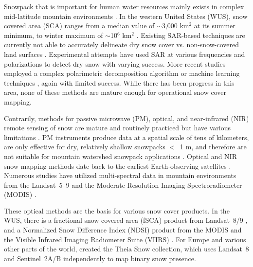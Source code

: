 Snowpack that is important for human water resources mainly exists in complex mid-latitude mountain environments \citep{barnettPotentialImpactsWarming2005}. In the western United States (WUS), snow covered area (SCA) ranges from a median value of $\sim$3,000 km$^{2}$ at its summer minimum, to winter maximum of $\sim$10$^{6}$ km$^{2}$ \citep{rittgerSnowToday2022}. Existing SAR-based techniques are currently not able to accurately delineate dry snow cover vs. non-snow-covered land surfaces \citep{tsaiRemoteSensingSnow2019}. Experimental attempts have used SAR at various frequencies and polarizations to detect dry snow \citep{rottThematicStudiesAlpine1994, shiMappingSeasonalSnow1997} with varying success. More recent studies employed a complex polarimetric decomposition algorithm \citep{varadeIdentificationSnowUsing2020} or machine learning techniques \citep{tsaiWetDrySnow2019}, again with limited success. While there has been progress in this area, none of these methods are mature enough for operational snow cover mapping. \par

Contrarily, methods for passive microwave (PM), optical, and near-infrared (NIR) remote sensing of snow are mature and routinely practiced but have various limitations \citep{nolinRecentAdvancesRemote2010,dozierMultispectralHyperspectralRemote2004,saberiReviewSnowWater2020}. PM instruments produce data at a spatial scale of tens of kilometers, are only effective for dry, relatively shallow snowpacks $<$~1 m, and therefore are not suitable for mountain watershed snowpack applications \citep{takalaEstimatingNorthernHemisphere2011a,pulliainenPatternsTrendsNorthern2020}. Optical and NIR snow mapping methods date back to the earliest Earth-observing satellites \citep{rangoSatellitePotentialsSnowcover1976a}. Numerous studies have utilized multi-spectral data in mountain environments from the Landsat~5--9 \citep{dozierSpectralSignatureAlpine1989} and the Moderate Resolution Imaging Spectroradiometer (MODIS) \citep{painterRetrievalSubpixelSnowcovered2003, painterRetrievalSubpixelSnow2009, rittgerAssessmentMethodsMapping2013}. 

These optical methods are the basis for various snow cover products. In the WUS, there is a fractional snow covered area (fSCA) product from Landsat~8/9 \citep{selkowitzUSGSLandsatSnow2017}, and a Normalized Snow Difference Index (NDSI) \citep{dozierSpectralSignatureAlpine1989, hallDevelopmentMethodsMapping1995} product from the MODIS \citep{hallMODISSnowcoverProducts2002} and the Visible Infrared Imaging Radiometer Suite (VIIRS) \citep{justiceLandCryosphereProducts2013}. For Europe and various other parts of the world, \cite{gascoinTheiaSnowCollection2019a} created the Theia Snow collection, which uses Landsat~8 and Sentinel~2A/B independently to map binary snow presence.

